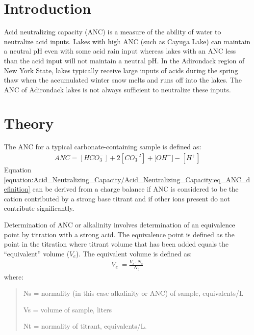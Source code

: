 \documentclass[letterpaper,10pt,english]{sphinxmanual}
\begin{document}
\section{Introduction}
\label{\detokenize{Acid_Neutralizing_Capacity/Acid_Neutralizing_Capacity:introduction}}\label{\detokenize{Acid_Neutralizing_Capacity/Acid_Neutralizing_Capacity:heading-anc-introduction}}
Acid neutralizing capacity (ANC) is a measure of the ability of water to neutralize acid inputs. Lakes with high ANC (such as Cayuga Lake) can maintain a neutral pH even with some acid rain input whereas lakes with an ANC less than the acid input will not maintain a neutral pH. In the Adirondack region of New York State, lakes typically receive large inputs of acids during the spring thaw when the accumulated winter snow melts and runs off into the lakes. The ANC of Adirondack lakes is not always sufficient to neutralize these inputs.


\section{Theory}
\label{\detokenize{Acid_Neutralizing_Capacity/Acid_Neutralizing_Capacity:theory}}\label{\detokenize{Acid_Neutralizing_Capacity/Acid_Neutralizing_Capacity:heading-anc-theory}}
The ANC for a typical carbonate-containing sample is defined as:
\begin{equation}\label{equation:Acid_Neutralizing_Capacity/Acid_Neutralizing_Capacity:eq_ANC_definition}
\begin{split}ANC = [HCO_3^-]+2[CO_3^{-2} ]+{[OH}^- ] - [H^+]\end{split}
\end{equation}
Equation \eqref{equation:Acid_Neutralizing_Capacity/Acid_Neutralizing_Capacity:eq_ANC_definition} can be derived from a charge balance if ANC is considered to be the cation contributed by a strong base titrant and if other ions present do not contribute significantly.

Determination of ANC or alkalinity involves determination of an equivalence point by titration with a strong acid. The equivalence point is defined as the point in the titration where titrant volume that has been added equals the “equivalent” volume (\(V_e\)). The equivalent volume is defined as:
\begin{equation}\label{equation:Acid_Neutralizing_Capacity/Acid_Neutralizing_Capacity:Acid_Neutralizing_Capacity/Acid_Neutralizing_Capacity:0}
\begin{split}V_{e} {\; =}\frac{V_{s} \cdot N_{s} }{N_{t} }\end{split}
\end{equation}
where:
\begin{quote}

\begin{DUlineblock}{0em}
\item[] Ns = normality (in this case alkalinity or ANC) of sample, equivalents/L
\item[] Vs = volume of sample, liters
\item[] Nt = normality of titrant, equivalents/L.
\end{DUlineblock}
\end{quote}
\end{document}
